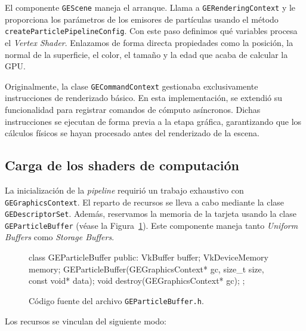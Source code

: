 El componente \texttt{GEScene} maneja el arranque. Llama a \texttt{GERenderingContext} y le proporciona los parámetros de los emisores de partículas usando el método \texttt{createParticlePipelineConfig}. Con este paso definimos qué variables procesa el \textit{Vertex Shader}. Enlazamos de forma directa propiedades como la posición, la normal de la superficie, el color, el tamaño y la edad que acaba de calcular la GPU.

Originalmente, la clase \texttt{GECommandContext} gestionaba exclusivamente instrucciones de renderizado básico. En esta implementación, se extendió su funcionalidad para registrar comandos de cómputo asíncronos.                                           
Dichas instrucciones se ejecutan de forma previa a la etapa gráfica, garantizando que los cálculos físicos se hayan procesado antes del renderizado de la escena.
\subsection{Carga de los shaders de computación}

La inicialización de la \textit{pipeline} requirió un trabajo exhaustivo con \texttt{GEGraphicsContext}. 
El reparto de recursos se lleva a cabo mediante la clase \texttt{GEDescriptorSet}. 
Además, reservamos la memoria de la tarjeta usando la clase \texttt{GEParticleBuffer} (véase la Figura~\ref{fig:geparticlebuffer_code}). 
Este componente maneja tanto \textit{Uniform Buffers} como \textit{Storage Buffers}.

\begin{figure}[!htbp]
    \centering
\begin{carbonbox}
class GEParticleBuffer
{
public:
    VkBuffer buffer;
    VkDeviceMemory memory;
    GEParticleBuffer(GEGraphicsContext* gc, size_t size, const void* data);
    void destroy(GEGraphicsContext* gc);
};
\end{carbonbox}
    \caption{Código fuente del archivo \texttt{GEParticleBuffer.h}.}
    \label{fig:geparticlebuffer_code}
\end{figure}

\noindent Los recursos se vinculan del siguiente modo:

